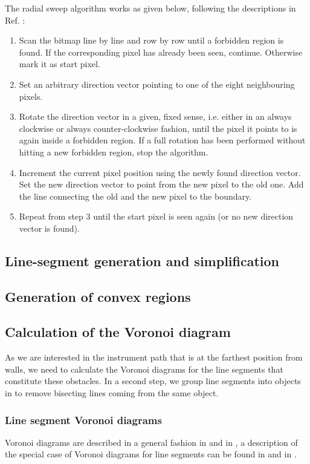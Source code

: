 The radial sweep algorithm works as given below, following the descriptions in Ref. \cite{web_radial_sweep}:
\begin{enumerate}
	\item Scan the bitmap line by line and row by row until a forbidden region is found. 
		If the corresponding pixel has already been seen, continue. Otherwise mark it as start pixel.
	\item Set an arbitrary direction vector pointing to one of the eight neighbouring pixels.
	\item Rotate the direction vector in a given, fixed sense, i.e. either in an always clockwise or 
		always counter-clockwise fashion, until the pixel it points to is again inside a forbidden region.
		If a full rotation has been performed without hitting a new forbidden region, stop the algorithm.
	\item Increment the current pixel position using the newly found direction vector. 
		Set the new direction vector to point from the new pixel to the old one.
		Add the line connecting the old and the new pixel to the boundary.
	\item Repeat from step 3 until the start pixel is seen again (or no new direction vector is found).
\end{enumerate}



\subsection{Line-segment generation and simplification}



\subsection{Generation of convex regions}
\label{sec:convex_regions}



\subsection{Calculation of the Voronoi diagram}
As we are interested in the instrument path that is at the farthest position from walls, we need to calculate
the Voronoi diagrams for the line segments that constitute these obstacles. In a second step, we group line
segments into objects in to remove bisecting lines coming from the same object.


\subsubsection*{Line segment Voronoi diagrams}
Voronoi diagrams are described in a general fashion in \cite[Ch. 7, pp. 147f]{Berg2008} and in
\cite[Ch. 5, pp. 209f]{Berg2008}, a description of the special case of Voronoi diagrams for line segments can be
found in \cite[Ch. 7.3, pp. 160-163]{Berg2008} and in \cite[pp. 242-247]{FUH_geo2020}.

